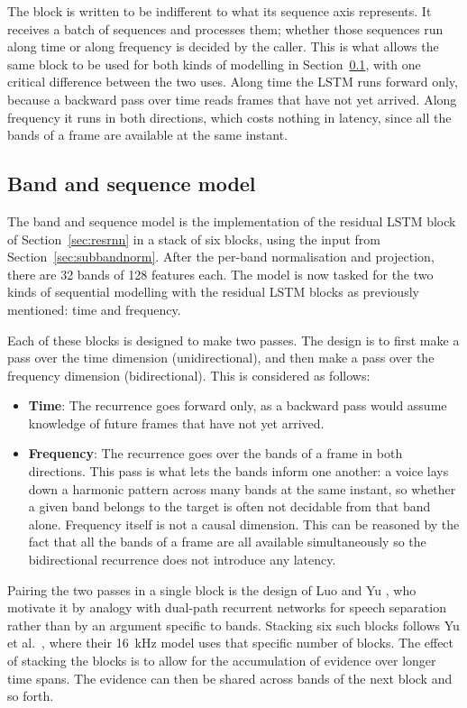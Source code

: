 The block is written to be indifferent to what its sequence axis represents. It
receives a batch of sequences and processes them; whether those sequences run along
time or along frequency is decided by the caller. This is what allows the same
block to be used for both kinds of modelling in Section~\ref{sec:bsnet}, with one
critical difference between the two uses. Along time the LSTM runs forward only,
because a backward pass over time reads frames that have not yet arrived. Along
frequency it runs in both directions, which costs nothing in latency, since all the
bands of a frame are available at the same instant.

\subsection{Band and sequence model}
\label{sec:bsnet}

The band and sequence model is the implementation of the residual LSTM block of Section~\ref{sec:resrnn} in a stack of six blocks, using the input from Section~\ref{sec:subbandnorm}. After the per-band normalisation and projection, there are 32 bands of 128 features each. The model is now tasked for the two kinds of sequential modelling with the residual LSTM blocks as previously mentioned: time and frequency. 

Each of these blocks is designed to make two passes. The design is to first make a pass over the time dimension (unidirectional), and then make a pass over the frequency dimension (bidirectional). This is considered as follows:
\begin{itemize}
    \item \textbf{Time}: The recurrence goes forward only, as a backward pass would assume knowledge of future frames  that have not yet arrived.
    \item \textbf{Frequency}: The recurrence goes over the bands of a frame in both directions. This pass is what lets the bands inform one another: a voice lays down a harmonic pattern across many bands at the same instant, so whether a given band belongs to the target is often not decidable from that band alone. Frequency itself is not a causal dimension. This can be reasoned by the fact that all the bands of a frame are all available simultaneously so the bidirectional recurrence does not introduce any latency. 
\end{itemize}
Pairing the two passes in a single block is the design of Luo and Yu \cite{luo2023music}, who motivate it by analogy with dual-path recurrent networks for speech separation rather than by an argument specific to bands. Stacking six such blocks follows Yu et al.\ \cite{yu2023high}, where their \SI{16}{\kHz} model uses that specific number of blocks. The effect of stacking the blocks is to allow for the accumulation of evidence over longer time spans. The evidence can then be shared across bands of the next block and so forth.


